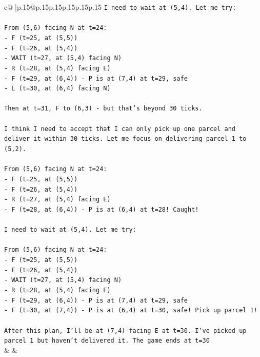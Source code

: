 \documentclass{article}
\begin{document}
{\begin{supertabular}{c@{$\;$}|p{.15\linewidth}@{}p{.15\linewidth}p{.15\linewidth}p{.15\linewidth}p{.15\linewidth}p{.15\linewidth}}
{{{\texttt{I need to wait at (5,4). Let me try:} \\
\\ 
\texttt{From (5,6) facing N at t=24:} \\
\texttt{{-} F (t=25, at (5,5))} \\
\texttt{{-} F (t=26, at (5,4))} \\
\texttt{{-} WAIT (t=27, at (5,4) facing N)} \\
\texttt{{-} R (t=28, at (5,4) facing E)} \\
\texttt{{-} F (t=29, at (6,4)) {-} P is at (7,4) at t=29, safe} \\
\texttt{{-} L (t=30, at (6,4) facing N)} \\
\\ 
\texttt{Then at t=31, F to (6,3) {-} but that's beyond 30 ticks.} \\
\\ 
\texttt{I think I need to accept that I can only pick up one parcel and deliver it within 30 ticks. Let me focus on delivering parcel 1 to (5,2).} \\
\\ 
\texttt{From (5,6) facing N at t=24:} \\
\texttt{{-} F (t=25, at (5,5))} \\
\texttt{{-} F (t=26, at (5,4))} \\
\texttt{{-} R (t=27, at (5,4) facing E)} \\
\texttt{{-} F (t=28, at (6,4)) {-} P is at (6,4) at t=28! Caught!} \\
\\ 
\texttt{I need to wait at (5,4). Let me try:} \\
\\ 
\texttt{From (5,6) facing N at t=24:} \\
\texttt{{-} F (t=25, at (5,5))} \\
\texttt{{-} F (t=26, at (5,4))} \\
\texttt{{-} WAIT (t=27, at (5,4) facing N)} \\
\texttt{{-} R (t=28, at (5,4) facing E)} \\
\texttt{{-} F (t=29, at (6,4)) {-} P is at (7,4) at t=29, safe} \\
\texttt{{-} F (t=30, at (7,4)) {-} P is at (6,4) at t=30, safe! Pick up parcel 1!} \\
\\ 
\texttt{After this plan, I'll be at (7,4) facing E at t=30. I've picked up parcel 1 but haven't delivered it. The game ends at t=30} \\
            }
        }
    }
    & & \\ \\


\end{supertabular}}
\end{document}
